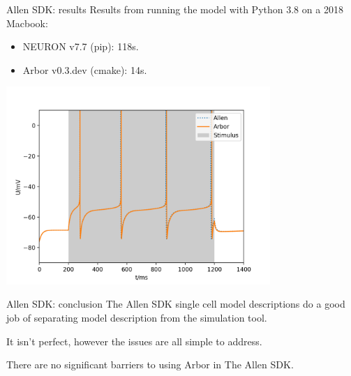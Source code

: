 \documentclass[aspectratio=43]{beamer}
\newcommand{\arbor}{{\ttfamily Arbor}\xspace}
\newcommand{\neuron}{{\ttfamily NEURON}\xspace}
\begin{document}
\begin{frame}[fragile]{Allen SDK: results}
    \vfill
    Results from running the model with Python 3.8 on a 2018 Macbook:
    \begin{itemize}
        \item \neuron v7.7 (pip): 118s.
        \item \arbor v0.3.dev (cmake): 14s.
    \end{itemize}

    \vspace{-15pt}

    \begin{center}
    \includegraphics[width=0.75\textwidth]{images/allen-vs-arbor-no-sphere-here.png}
    \end{center}

\end{frame}

\begin{frame}[fragile]{Allen SDK: conclusion}
    The Allen SDK single cell model descriptions do a good job of separating model description from the simulation tool.

    \vspace{20pt}

    It isn't perfect, however the issues are all simple to address.

    \vspace{20pt}

    There are no significant barriers to using \arbor in The Allen SDK.
\end{frame}

\end{document}
